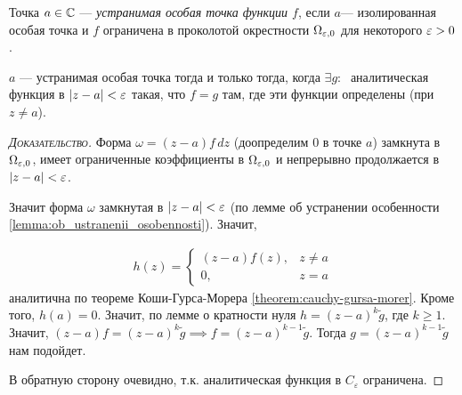 \documentclass[../complex-analysis.tex]{subfiles}
\begin{document}
\begin{df}
 Точка $ a \in \mathbb{C} $ --- \textit{устранимая особая точка функции $ f $}, если $ a $--- изолированная особая точка и $ f $ ограничена в проколотой окрестности $ \Omega_{\varepsilon,0} $ для некоторого $ \varepsilon > 0 $.
\end{df}
\begin{lm}
 $ a $ --- устранимая особая точка тогда и только тогда, когда $ \exists  g  \colon\;  $ аналитическая функция в $ \left| z-a \right| < \varepsilon $ такая, что $ f=g $ там, где эти функции определены (при $ z \neq a $).
\end{lm}
\begin{proof}[\normalfont\textsc{Доказательство}]
 Форма $ \omega = (z-a)f\,dz $ (доопределим $ 0 $ в точке $ a $) замкнута в $ \Omega_{\varepsilon,0} $, имеет ограниченные коэффициенты в $ \Omega_{\varepsilon,0} $ и непрерывно продолжается в $ \left| z-a \right| < \varepsilon $.

 Значит форма $ \omega $ замкнутая в $ \left| z-a \right| < \varepsilon $ (по лемме об устранении особенности \eqref{lemma:ob_ustranenii_osobennosti}). Значит,

 \begin{align*}
	 h(z) = \begin{cases}
		 (z - a) f(z), &z \neq a \\
		 0, &z = a
	 \end{cases}
 \end{align*} аналитична по теореме Коши-Гурса-Морера \eqref{theorem:cauchy-gursa-morer}. Кроме того, $ h(a) = 0 $. Значит, по лемме о кратности нуля $ h = (z-a)^{k}\tilde g $, где $ k \geqslant 1 $. Значит, $ (z-a)f = (z-a)^{k}\tilde g \implies f = (z-a)^{k-1}\tilde g $. Тогда $ g = (z-a)^{k-1}\tilde g $ нам подойдет.

 В обратную сторону очевидно, т.к. аналитическая функция в $C_\varepsilon$ ограничена. 
\end{proof}
\end{document}
